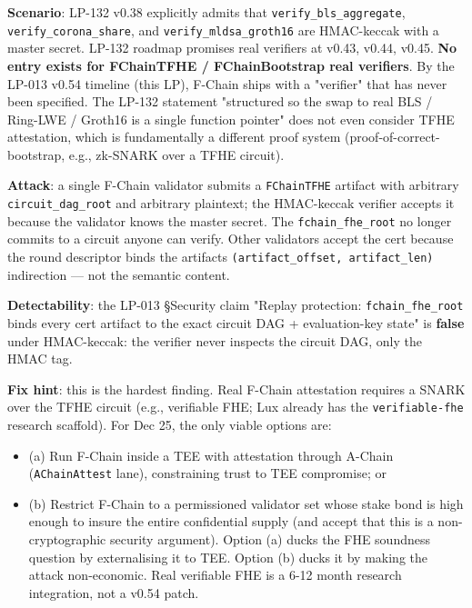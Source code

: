 \documentclass[
]{article}
\providecommand{\tightlist}{%
  \setlength{\itemsep}{0pt}\setlength{\parskip}{0pt}}
\begin{document}
\textbf{Scenario}: LP-132 v0.38 explicitly admits that
\texttt{verify\_bls\_aggregate}, \texttt{verify\_corona\_share}, and
\texttt{verify\_mldsa\_groth16} are HMAC-keccak with a master secret.
LP-132 roadmap promises real verifiers at v0.43, v0.44, v0.45.
\textbf{No entry exists for FChainTFHE / FChainBootstrap real
verifiers}. By the LP-013 v0.54 timeline (this LP), F-Chain ships with a
"verifier" that has never been specified. The LP-132 statement
"structured so the swap to real BLS / Ring-LWE / Groth16 is a single
function pointer" does not even consider TFHE attestation, which is
fundamentally a different proof system (proof-of-correct-bootstrap,
e.g., zk-SNARK over a TFHE circuit).

\textbf{Attack}: a single F-Chain validator submits a
\texttt{FChainTFHE} artifact with arbitrary \texttt{circuit\_dag\_root}
and arbitrary plaintext; the HMAC-keccak verifier accepts it because the
validator knows the master secret. The \texttt{fchain\_fhe\_root} no
longer commits to a circuit anyone can verify. Other validators accept
the cert because the round descriptor binds the
artifact\textquotesingle s \texttt{(artifact\_offset,\ artifact\_len)}
indirection --- not the semantic content.

\textbf{Detectability}: the LP-013 §Security claim "Replay protection:
\texttt{fchain\_fhe\_root} binds every cert artifact to the exact
circuit DAG + evaluation-key state" is \textbf{false} under HMAC-keccak:
the verifier never inspects the circuit DAG, only the HMAC tag.

\textbf{Fix hint}: this is the hardest finding. Real F-Chain attestation
requires a SNARK over the TFHE circuit (e.g., verifiable FHE; Lux
already has the \texttt{verifiable-fhe} research scaffold). For Dec 25,
the only viable options are:

\begin{itemize}
\tightlist
\item
  (a) Run F-Chain inside a TEE with attestation through A-Chain
  (\texttt{AChainAttest} lane), constraining trust to TEE compromise; or
\item
  (b) Restrict F-Chain to a permissioned validator set whose stake bond
  is high enough to insure the entire confidential supply (and accept
  that this is a non-cryptographic security argument). Option (a) ducks
  the FHE soundness question by externalising it to TEE. Option (b)
  ducks it by making the attack non-economic. Real verifiable FHE is a
  6-12 month research integration, not a v0.54 patch.
\end{itemize}
\end{document}
